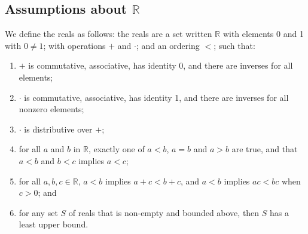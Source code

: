 \subsection{Assumptions about \(\mathbb R\)}
We define the reals as follows: the reals are a set written \(\mathbb R\) with elements 0 and 1 with \(0 \neq 1\); with operations \(+\) and \(\cdot\); and an ordering \(<\); such that:
\begin{enumerate}
	\item \(+\) is commutative, associative, has identity 0, and there are inverses for all elements;
	\item \(\cdot\) is commutative, associative, has identity 1, and there are inverses for all nonzero elements;
	\item \(\cdot\) is distributive over \(+\);
	\item for all \(a\) and \(b\) in \(\mathbb R\), exactly one of \(a<b\), \(a=b\) and \(a>b\) are true, and that \(a<b\) and \(b<c\) implies \(a<c\);
	\item for all \(a, b, c \in \mathbb R\), \(a<b\) implies \(a + c < b + c\), and \(a<b\) implies \(ac < bc\) when \(c > 0\); and
	\item for any set \(S\) of reals that is non-empty and bounded above, then \(S\) has a least upper bound.
\end{enumerate}
